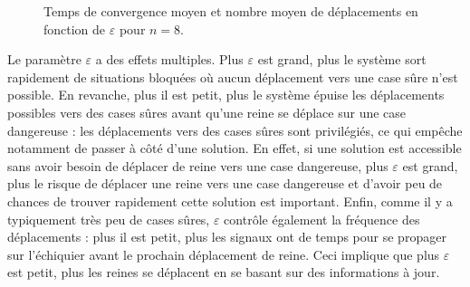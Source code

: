 \documentclass[11pt, openany]{article}
\begin{document}
\begin{figure}
  \centering
  \caption{Temps de convergence moyen et nombre moyen de déplacements en fonction de $\varepsilon$ pour $n=8$.}
\end{figure}   

Le paramètre $\varepsilon$ a des effets multiples. Plus $\varepsilon$ est grand, plus le système sort rapidement de situations bloquées où aucun déplacement vers une case sûre n'est possible. En revanche, plus il est petit, plus le système épuise les déplacements possibles vers des cases sûres avant qu'une reine se déplace sur une case dangereuse : les déplacements vers des cases sûres sont privilégiés, ce qui empêche notamment de passer à côté d'une solution. En effet, si une solution est accessible sans avoir besoin de déplacer de reine vers une case dangereuse, plus $\varepsilon$ est grand, plus le risque de déplacer une reine vers une case dangereuse et d'avoir peu de chances de trouver rapidement cette solution est important. Enfin, comme il y a typiquement très peu de cases sûres, $\varepsilon$ contrôle également la fréquence des déplacements : plus il est petit, plus les signaux ont de temps pour se propager sur l'échiquier avant le prochain déplacement de reine. Ceci implique que plus $\varepsilon$ est petit, plus les reines se déplacent en se basant sur des informations à jour. 
\end{document}
